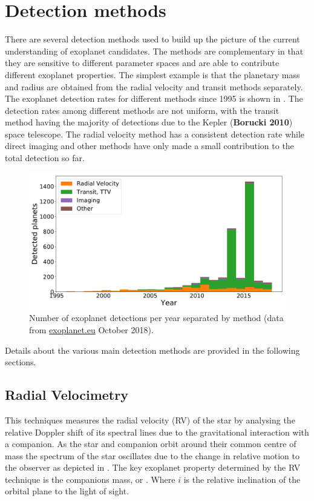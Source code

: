 \section{Detection methods}
There are several detection methods used to build up the picture of the current understanding of exoplanet candidates. The methods are complementary in that they are sensitive to different parameter spaces and are able to contribute different exoplanet properties. The simplest example is that the planetary mass and radius are obtained from the radial velocity and transit methods separately. The exoplanet detection rates for different methods since 1995 is shown in . The detection rates among different methods are not uniform, with the transit method having the majority of detections due to the Kepler (\textbf{Borucki 2010}) space telescope. The radial velocity method has a consistent detection rate while direct imaging and other methods have only made a small contribution to the total detection so far.

\begin{figure}
    \centering
    \includegraphics[width=0.7\linewidth]{./figures/introduction/exoplanetEU_year_method.pdf}
    \caption{Number of exoplanet detections per year separated by method (data from \href{http://ww.exoplanet.eu}{exoplanet.eu} October 2018).}
    \label{fig:detection_year_method}
\end{figure}


Details about the various main detection methods are provided in the following sections.

\subsection{Radial Velocimetry}
This techniques measures the radial velocity (RV) of the star by analysing the relative Doppler shift of its spectral lines due to the gravitational interaction with a companion. As the star and companion orbit around their common centre of mass the spectrum of the star oscillates due to the change in relative motion to the observer as depicted in . The key exoplanet property determined by the RV technique is the companions mass, or \mtwosini. Where $i$ is the relative inclination of the orbital plane to the light of sight.

